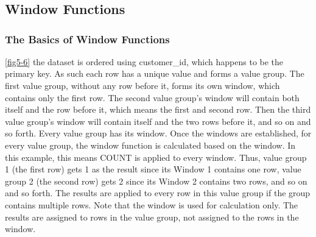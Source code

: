 \chapter{\label{ch05}}
\section{Window Functions}
\subsection{The Basics of Window Functions}

\autoref{fig5-6} the dataset is ordered using customer\_id, which happens to be the primary key. As such each row has a unique value and forms a value group. The first value group, without any row before it, forms its own window, which contains only the first row. The second value group's window will contain both itself and the row before it, which means the first and second row. Then the third value group's window will contain itself and the two rows before it, and so on and so forth. Every value group has its window. Once the windows are established, for every value group, the window function is calculated based on the window. In this example, this means COUNT is applied to every window. Thus, value group 1 (the first row) gets 1 as the result since its Window 1 contains one row, value group 2 (the second row) gets 2 since its Window 2 contains two rows, and so on and so forth. The results are applied to every row in this value group if the group contains multiple rows. Note that the window is used for calculation only. The results are assigned to rows in the value group, not assigned to the rows in the window.

